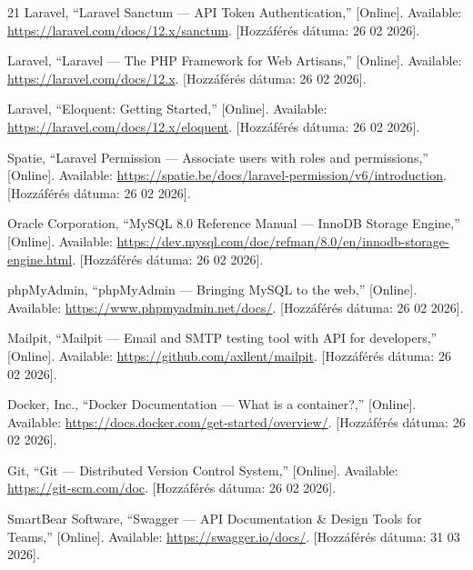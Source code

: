 \documentclass[colorlinks]{thesis-kando}
\begin{document}
\begin{thebibliography}{21}
Laravel, ``Laravel Sanctum --- API Token Authentication,'' [Online]. Available: \url{https://laravel.com/docs/12.x/sanctum}. [Hozzáférés dátuma: 26 02 2026].

Laravel, ``Laravel --- The PHP Framework for Web Artisans,'' [Online]. Available: \url{https://laravel.com/docs/12.x}. [Hozzáférés dátuma: 26 02 2026].

Laravel, ``Eloquent: Getting Started,'' [Online]. Available: \url{https://laravel.com/docs/12.x/eloquent}. [Hozzáférés dátuma: 26 02 2026].

Spatie, ``Laravel Permission --- Associate users with roles and permissions,'' [Online]. Available: \url{https://spatie.be/docs/laravel-permission/v6/introduction}. [Hozzáférés dátuma: 26 02 2026].

Oracle Corporation, ``MySQL 8.0 Reference Manual --- InnoDB Storage Engine,'' [Online]. Available: \url{https://dev.mysql.com/doc/refman/8.0/en/innodb-storage-engine.html}. [Hozzáférés dátuma: 26 02 2026].

phpMyAdmin, ``phpMyAdmin --- Bringing MySQL to the web,'' [Online]. Available: \url{https://www.phpmyadmin.net/docs/}. [Hozzáférés dátuma: 26 02 2026].

Mailpit, ``Mailpit --- Email and SMTP testing tool with API for developers,'' [Online]. Available: \url{https://github.com/axllent/mailpit}. [Hozzáférés dátuma: 26 02 2026].

Docker, Inc., ``Docker Documentation --- What is a container?,'' [Online]. Available: \url{https://docs.docker.com/get-started/overview/}. [Hozzáférés dátuma: 26 02 2026].

Git, ``Git --- Distributed Version Control System,'' [Online]. Available: \url{https://git-scm.com/doc}. [Hozzáférés dátuma: 26 02 2026].

SmartBear Software, ``Swagger --- API Documentation \& Design Tools for Teams,'' [Online]. Available: \url{https://swagger.io/docs/}. [Hozzáférés dátuma: 31 03 2026].

\end{thebibliography}
\end{document}
